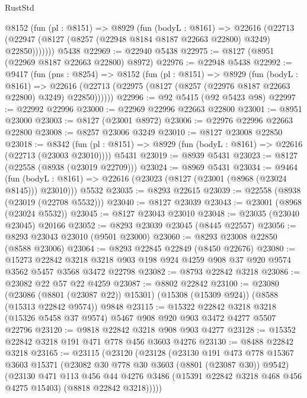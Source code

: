 \begin{lexlean}{RustStd}
\begin{coremodule}
      @8152
        (fun (pl : @8151) =>
        @8929
          (fun (bodyL : @8161) =>
          @22616
            (@22713 (@22947 (@8127 (@8257 (@22948 @8184 @8187 @22663 @22800) @3249) @22850)))))))
    @5438
@22969 := @22940 @5438
@22975 := @8127 (@8951 (@22969 @8187 @22663 @22800) @8972)
@22976 := @22948 @5438
@22992 := @9417
    (fun (pns : @8254) =>
    @8152
      (fun (pl : @8151) =>
      @8929
        (fun (bodyL : @8161) =>
        @22616 (@22713 (@22975 (@8127 (@8257 (@22976 @8187 @22663 @22800) @3249) @22850))))))
@22996 := @92 @5415 (@92 @5423 @98)
@22997 := @22992 @22996
@23000 := @22969 @22996 @22663 @22800
@23001 := @8951 @23000
@23003 := @8127 (@23001 @8972)
@23006 := @22976 @22996 @22663 @22800
@23008 := @8257 @23006 @3249
@23010 := @8127 @23008 @22850
@23018 := @8342
    (fun (pl : @8151) => @8929 (fun (bodyL : @8161) => @22616 (@22713 (@23003 @23010))))
    @5431
@23019 := @8939 @5431
@23023 := @8127 (@22558 (@8938 (@23019 @22709)))
@23024 := @8969 @5431
@23034 := @9464
    (fun (bodyL : @8161) => @22616 (@23023 (@8127 (@23001 (@8968 (@23024 @8145))) @23010)))
    @5532
@23035 := @8293 @22615
@23039 := @22558 (@8938 (@23019 (@22708 @5532)))
@23040 := @8127 @23039
@23043 := @23001 (@8968 (@23024 @5532))
@23045 := @8127 @23043 @23010
@23048 := @23035 (@23040 @23045) @20166
@23052 := @8293 @23039 @23045 (@8445 @22557)
@23056 := @8293 @23043 @23010 (@9501 @23000)
@23060 := @8293 @23008 @22850 (@8588 @23006)
@23064 := @8293 @22845 @22849 (@8450 @22676)
@23080 := @15273
    @22842
    @3218
    @3218
    @903
    @198
    @924
    @4259
    @908
    @37
    @920
    @9574
    @3562
    @5457
    @3568
    @3472
    @22798
@23082 := @8793 @22842 @3218
@23086 := @23082 @22 @57 @22 @4259
@23087 := @8802 @22842
@23100 := @23080
    (@23086 (@8801 (@23087 @22)) @15301)
    (@15308 (@15309 @924))
    (@8588 (@15313 @22842 @9574))
    @9848
@23115 := @15322
    @22842
    @3218
    @3218
    (@15326 @5458 @37 @9574)
    @5467
    @908
    @920
    @903
    @3472
    @4277
    @5507
    @22796
@23120 := @9818 @22842 @3218 @908 @903 @4277
@23128 := @15352 @22842 @3218 @191 @471 @778 @456 @3603 @4276
@23130 := @8488 @22842 @3218
@23165 := @23115
    (@23120
      (@23128
        (@23130
          @191
          @473
          @778
          @15367
          @3603
          @15371
          (@23082 @30 @778 @30 @3603 (@8801 (@23087 @30)) @9542)
          (@23130
            @471
            @113
            @456
            @44
            @4276
            @3486
            (@15391 @22842 @3218 @468 @456 @4275 @15403)
            (@8818 @22842 @3218)))))

\end{coremodule}
\end{lexlean}
